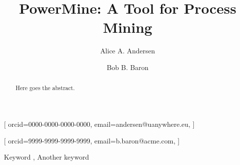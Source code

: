 \documentclass[
]{ceurart}
\begin{document}


\title{PowerMine: A Tool for Process Mining}

\tnotemark[1]

\author[1]{Alice A. Andersen}[%
orcid=0000-0000-0000-0000,
email=andersen@uanywhere.eu,
]
\cormark[1]
\fnmark[1]
\address[1]{University of Anywhere,
  University St. 42, 12345 Happyville, Country}

\author[2]{Bob B. Baron}[%
orcid=9999-9999-9999-9999,
email=b.baron@acme.com,
]
\fnmark[1]
\address[2]{ACME Inc., Profit St. 123, 12345 Happyville, Country}

\fnmark[1]


\begin{abstract}
  Here goes the abstract.
\end{abstract}

\begin{keywords}
  Keyword \sep
  Another keyword 
\end{keywords}

\maketitle
\end{document}
